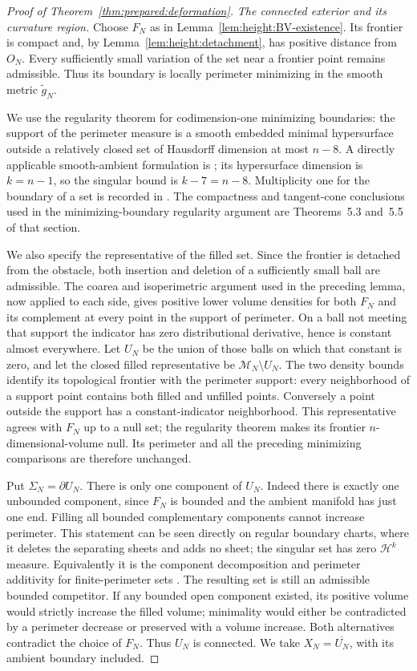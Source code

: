 \begin{proof}[Proof of Theorem~\ref{thm:prepared:deformation}]
\emph{The connected exterior and its curvature region.} Choose $F_N$ as in Lemma~\ref{lem:height:BV-existence}.  Its frontier
is compact and, by Lemma~\ref{lem:height:detachment}, has positive
distance from $O_N$.  Every sufficiently small variation of the set
near a frontier point remains admissible.  Thus its boundary is locally
perimeter minimizing in the smooth metric $\widetilde g_N$.

We use the regularity theorem for codimension-one minimizing boundaries:
the support of the perimeter measure is a smooth embedded minimal
hypersurface outside a relatively closed set of Hausdorff dimension at
most $n-8$. A directly applicable smooth-ambient formulation is
\cite[Chapter~7, Section~5, Theorem~5.8]{SimonGMT}; its hypersurface
dimension is $k=n-1$, so the singular bound is $k-7=n-8$.
Multiplicity one for the boundary of a set is recorded in
\cite[Chapter~7, Section~5, Remark~5.2]{SimonGMT}. The compactness and
tangent-cone conclusions used in the minimizing-boundary regularity
argument are Theorems~5.3 and~5.5 of that section.

We also specify the representative of the filled set. Since the
frontier is detached from the obstacle, both insertion and deletion
of a sufficiently small ball are admissible. The coarea and
isoperimetric argument used in the preceding lemma, now applied to
each side, gives positive lower volume densities for both $F_N$ and
its complement at every point in the support of perimeter. On a ball
not meeting that support the indicator has zero distributional
derivative, hence is constant almost everywhere. Let $U_N$ be the
union of those balls on which that constant is zero, and let the
closed filled representative be $\mathcal M_N\setminus U_N$.
The two density bounds identify its topological frontier with the
perimeter support: every neighborhood of a support point contains
both filled and unfilled points. Conversely a point outside the
support has a constant-indicator neighborhood. This representative
agrees with $F_N$ up to a null set; the regularity theorem makes its
frontier $n$-dimensional-volume null. Its perimeter and all the
preceding minimizing comparisons are therefore unchanged.

Put $\Sigma_N=\partial U_N$.
There is only one component of $U_N$.  Indeed there is exactly one
unbounded component, since $F_N$ is bounded and the ambient manifold
has just one end.  Filling all bounded complementary components cannot
increase perimeter.  This statement can be seen directly on regular
boundary charts, where it deletes the separating sheets and adds no
sheet; the singular set has zero $\mathcal H^k$ measure.  Equivalently
it is the component decomposition and perimeter additivity for
finite-perimeter sets \cite{AFP}.  The resulting set is still an
admissible bounded competitor.  If any bounded open component existed,
its positive volume would strictly increase the filled volume; minimality
would either be contradicted by a perimeter decrease or preserved with
a volume increase.  Both alternatives contradict the choice of $F_N$.
Thus $U_N$ is connected.  We take $X_N=\overline{U_N}$, with its
ambient boundary included.


\end{proof}
